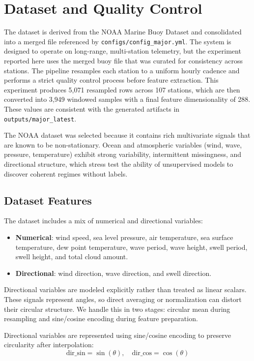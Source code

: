 \documentclass[conference]{IEEEtran}
\begin{document}
\section{Dataset and Quality Control}
The dataset is derived from the NOAA Marine Buoy Dataset and consolidated into a merged file referenced by \texttt{configs/config\_major.yml}. The system is designed to operate on long-range, multi-station telemetry, but the experiment reported here uses the merged buoy file that was curated for consistency across stations. The pipeline resamples each station to a uniform hourly cadence and performs a strict quality control process before feature extraction. This experiment produces 5{,}071 resampled rows across 107 stations, which are then converted into 3{,}949 windowed samples with a final feature dimensionality of 288. These values are consistent with the generated artifacts in \texttt{outputs/major\_latest}.

The NOAA dataset was selected because it contains rich multivariate signals that are known to be non-stationary. Ocean and atmospheric variables (wind, wave, pressure, temperature) exhibit strong variability, intermittent missingness, and directional structure, which stress test the ability of unsupervised models to discover coherent regimes without labels.

\subsection{Dataset Features}
The dataset includes a mix of numerical and directional variables:
\begin{itemize}
\item \textbf{Numerical}: wind speed, sea level pressure, air temperature, sea surface temperature, dew point temperature, wave period, wave height, swell period, swell height, and total cloud amount.
\item \textbf{Directional}: wind direction, wave direction, and swell direction.
\end{itemize}

Directional variables are modeled explicitly rather than treated as linear scalars. These signals represent angles, so direct averaging or normalization can distort their circular structure. We handle this in two stages: circular mean during resampling and sine/cosine encoding during feature preparation.

Directional variables are represented using sine/cosine encoding to preserve circularity after interpolation:
\[
\text{dir\_sin}=\sin(\theta), \quad \text{dir\_cos}=\cos(\theta)
\]
\end{document}
